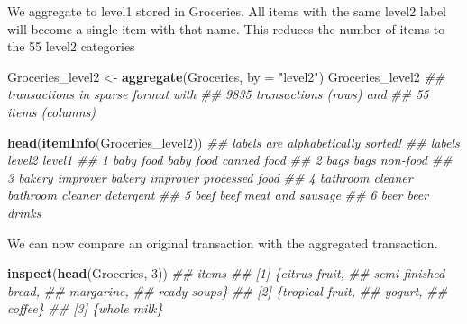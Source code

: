 \documentclass[
  notitlepage]{book}
\newenvironment{Shaded}{\begin{snugshade}}{\end{snugshade}}
\newcommand{\CommentTok}[1]{\textcolor[rgb]{0.56,0.35,0.01}{\textit{#1}}}
\newcommand{\DataTypeTok}[1]{\textcolor[rgb]{0.13,0.29,0.53}{#1}}
\newcommand{\DecValTok}[1]{\textcolor[rgb]{0.00,0.00,0.81}{#1}}
\newcommand{\KeywordTok}[1]{\textcolor[rgb]{0.13,0.29,0.53}{\textbf{#1}}}
\newcommand{\NormalTok}[1]{#1}
\newcommand{\StringTok}[1]{\textcolor[rgb]{0.31,0.60,0.02}{#1}}
\begin{document}
We aggregate to level1 stored in Groceries. All items with the same level2 label
will become a single item with that name. This reduces the number of items to
the 55 level2 categories

\begin{Shaded}
\begin{Highlighting}[]
\NormalTok{Groceries\_level2 \textless{}{-}}\StringTok{ }\KeywordTok{aggregate}\NormalTok{(Groceries, }\DataTypeTok{by =} \StringTok{"level2"}\NormalTok{)}
\NormalTok{Groceries\_level2}
\CommentTok{\#\# transactions in sparse format with}
\CommentTok{\#\#  9835 transactions (rows) and}
\CommentTok{\#\#  55 items (columns)}
\end{Highlighting}
\end{Shaded}

\begin{Shaded}
\begin{Highlighting}[]
\KeywordTok{head}\NormalTok{(}\KeywordTok{itemInfo}\NormalTok{(Groceries\_level2)) }\CommentTok{\#\# labels are alphabetically sorted!}
\CommentTok{\#\#             labels           level2           level1}
\CommentTok{\#\# 1        baby food        baby food      canned food}
\CommentTok{\#\# 2             bags             bags         non{-}food}
\CommentTok{\#\# 3  bakery improver  bakery improver   processed food}
\CommentTok{\#\# 4 bathroom cleaner bathroom cleaner        detergent}
\CommentTok{\#\# 5             beef             beef meat and sausage}
\CommentTok{\#\# 6             beer             beer           drinks}
\end{Highlighting}
\end{Shaded}

We can now compare an original transaction with the aggregated transaction.

\begin{Shaded}
\begin{Highlighting}[]
\KeywordTok{inspect}\NormalTok{(}\KeywordTok{head}\NormalTok{(Groceries, }\DecValTok{3}\NormalTok{))}
\CommentTok{\#\#     items                 }
\CommentTok{\#\# [1] \{citrus fruit,        }
\CommentTok{\#\#      semi{-}finished bread, }
\CommentTok{\#\#      margarine,           }
\CommentTok{\#\#      ready soups\}         }
\CommentTok{\#\# [2] \{tropical fruit,      }
\CommentTok{\#\#      yogurt,              }
\CommentTok{\#\#      coffee\}              }
\CommentTok{\#\# [3] \{whole milk\}}
\end{Highlighting}
\end{Shaded}
\end{document}
